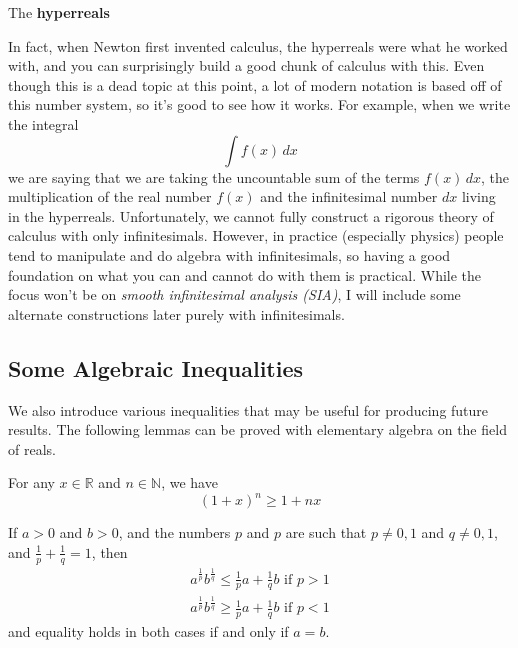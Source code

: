   \begin{theorem}[Hyperreals]
    The \textbf{hyperreals} 
  \end{theorem}

  In fact, when Newton first invented calculus, the hyperreals were what he worked with, and you can surprisingly build a good chunk of calculus with this. Even though this is a dead topic at this point, a lot of modern notation is based off of this number system, so it's good to see how it works. For example, when we write the integral 
  \begin{equation}
    \int f(x) \,dx
  \end{equation} 
  we are saying that we are taking the uncountable sum of the terms $f(x) \,dx$, the multiplication of the real number $f(x)$ and the infinitesimal number $dx$ living in the hyperreals. Unfortunately, we cannot fully construct a rigorous theory of calculus with only infinitesimals. However, in practice (especially physics) people tend to manipulate and do algebra with infinitesimals, so having a good foundation on what you can and cannot do with them is practical. While the focus won't be on \textit{smooth infinitesimal analysis (SIA)}, I will include some alternate constructions later purely with infinitesimals. 

\subsection{Some Algebraic Inequalities}

  We also introduce various inequalities that may be useful for producing future results. The following lemmas can be proved with elementary algebra on the field of reals. 

  \begin{lemma}
    For any $x \in \mathbb{R}$ and $n \in \mathbb{N}$, we have 
    \begin{equation}
      (1 + x)^n \geq 1 + nx
    \end{equation}
  \end{lemma}

  \begin{lemma}
    If $a>0$ and $b>0$, and the numbers $p$ and $p$ are such that $p \neq 0, 1$ and $q \neq 0, 1$, and $\frac{1}{p} + \frac{1}{q} = 1$, then 
    \begin{align*}
        a^{\frac{1}{p}} b^{\frac{1}{q}} \leq \frac{1}{p} a + \frac{1}{q} b \text{  if } p > 1 \\
        a^{\frac{1}{p}} b^{\frac{1}{q}} \geq \frac{1}{p} a + \frac{1}{q} b \text{  if } p < 1
    \end{align*}
    and equality holds in both cases if and only if $a = b$. 
  \end{lemma}

